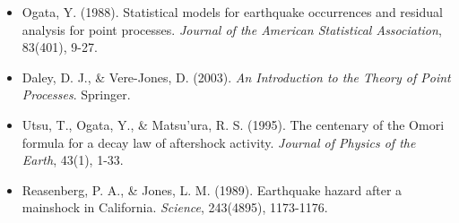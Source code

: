 \documentclass{article}
\begin{document}
\begin{itemize}
    \item Ogata, Y. (1988). Statistical models for earthquake occurrences and residual analysis for point processes. \textit{Journal of the American Statistical Association}, 83(401), 9-27.

    \item Daley, D. J., \& Vere-Jones, D. (2003). \textit{An Introduction to the Theory of Point Processes}. Springer.

    \item Utsu, T., Ogata, Y., \& Matsu'ura, R. S. (1995). The centenary of the Omori formula for a decay law of aftershock activity. \textit{Journal of Physics of the Earth}, 43(1), 1-33.

    \item Reasenberg, P. A., \& Jones, L. M. (1989). Earthquake hazard after a mainshock in California. \textit{Science}, 243(4895), 1173-1176.
\end{itemize}
\end{document}
